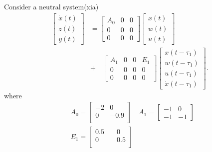 \documentclass[twocolumn]{autart}    %
\begin{document}
\begin{exmp}
    Consider a neutral system(xia)
    \begin{equation}
        \begin{aligned}
            \begin{bmatrix}
                \dot{x}(t) \\
                z(t) \\
                y(t) 
            \end{bmatrix} & = \begin{bmatrix}
                A_{0} & 0 & 0\\
                0 & 0 & 0\\
                0 & 0 & 0
            \end{bmatrix}\begin{bmatrix}
                x(t) \\
                w(t) \\
                u(t) 
            \end{bmatrix} \\ 
            &+ \quad \begin{bmatrix}
                A_{1} & 0 &0 & E_{1}\\
                0 & 0 & 0 & 0\\
                0 & 0 & 0 & 0
            \end{bmatrix} \begin{bmatrix}
                x(t-\tau_{1}) \\
                w(t-\tau_{1}) \\
                u(t-\tau_{1}) \\
                \dot{x}(t-\tau_{1})
            \end{bmatrix}.\label{eq}
        \end{aligned}
    \end{equation}
where
    \begin{equation}
        \begin{aligned}
            &A_{0} =  \begin{bmatrix}
                -2 & 0\\
                0 & -0.9\\
            \end{bmatrix}
            &A_{1} =  \begin{bmatrix}
                -1 & 0\\
                -1 & -1
            \end{bmatrix}\\
            &E_{1} =  \begin{bmatrix}
                0.5 & \quad 0\\
                0 & \quad 0.5\\
            \end{bmatrix}\\
        \end{aligned}
        \nonumber
    \end{equation}
    

\end{exmp}
\end{document}
